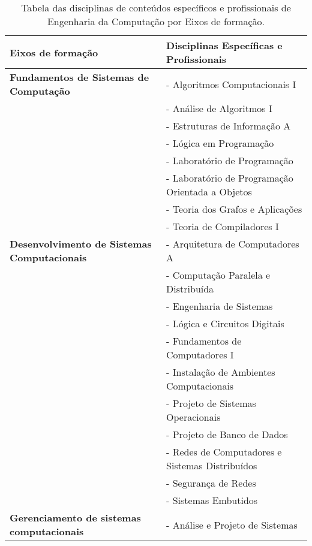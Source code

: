 \begin{table}[ht]
  \centering
  \caption{Tabela das disciplinas de conteúdos específicos e profissionais de Engenharia da Computação por Eixos de formação.}
  \label{tab:eixos}
  \begin{tabular}{l l}
    \hline
    {\bf Eixos de formação} & {\bf Disciplinas Específicas e Profissionais}          \\
    \hline
    \textbf{Fundamentos de Sistemas de Computação}
                            & - Algoritmos Computacionais I                          \\
                            & - Análise de Algoritmos I                              \\
                            & - Estruturas de Informação A                           \\
                            & - Lógica em Programação                                \\
                            & - Laboratório de Programação                           \\
                            & - Laboratório de Programação Orientada a Objetos       \\
                            & - Teoria dos Grafos e Aplicações                       \\
                            & - Teoria de Compiladores I                             \\ \hline
    \textbf{Desenvolvimento de Sistemas Computacionais}
                            & - Arquitetura de Computadores A                        \\
                            & - Computação Paralela e Distribuída                    \\
                            & - Engenharia de Sistemas                               \\
                            & - Lógica e Circuitos Digitais                          \\
                            & - Fundamentos de Computadores I                        \\
                            & - Instalação de Ambientes Computacionais               \\
                            & - Projeto de Sistemas Operacionais                     \\
                            & - Projeto de Banco de Dados                            \\
                            & - Redes de Computadores e Sistemas Distribuídos        \\
                            & - Segurança de Redes                                   \\
                            & - Sistemas Embutidos                                   \\
    \hline
    \textbf{Gerenciamento de sistemas computacionais}
                            & - Análise e Projeto de Sistemas                        \\


\end{tabular}
\end{table}
